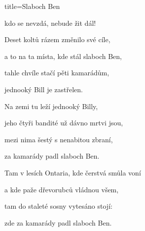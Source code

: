 \begin{song}{title=\centering Slaboch Ben \\\normalsize  \vspace*{-0.3cm}}
{	kdo se nevzdá, nebude žit dál!
	
	
\sloka	
	Deset koltů rázem změnilo své cíle,
	
	a to na ta místa, kde stál slaboch Ben,
	
	tahle chvíle stačí pěti kamarádům,
	
	jednooký Bill je zastřelen.

	
\sloka	
	Na zemi tu leží jednooký Billy,
	
	jeho čtyři bandité už dávno mrtvi jsou,
	
	mezi nima šestý s nenabitou zbraní,
	
	za kamarády padl slaboch Ben.

	
\sloka	
	Tam v lesích Ontaria, kde čerstvá smůla voní

	a kde paže dřevorubců vládnou všem,
	
	tam do staleté sosny vytesáno stojí:
	
	zde za kamarády padl slaboch Ben.


}
\setcounter{Slokočet}{0}
\end{song}

